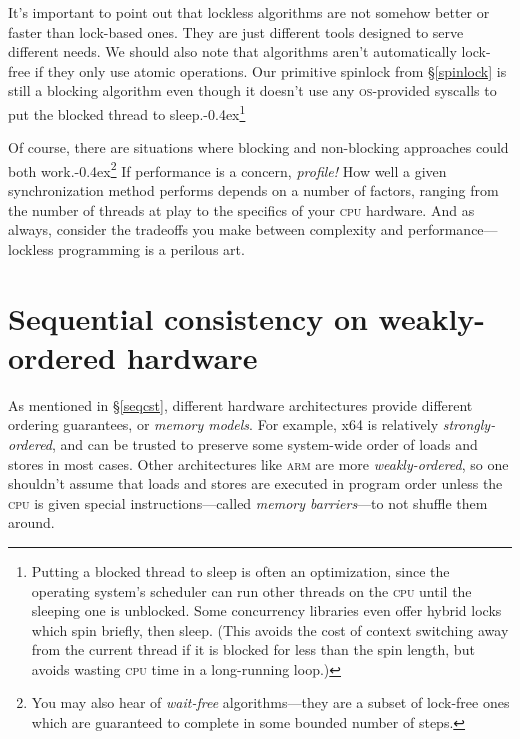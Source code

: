 \documentclass[fontsize=10pt, numbers=endperiod]{scrartcl}
\newcommand{\punckern}{\kern-0.4ex}
\newcommand{\introduce}[1]{\textit{#1}}
\newcommand{\secref}[1]{\hyperref[#1]{\textsc{\S}\ref*{#1}}}
\begin{document}
\begin{multicols*}{2}
It's important to point out that lockless algorithms are not somehow better
or faster than lock-based ones.
They are just different tools designed to serve different needs.
We should also note that algorithms aren't automatically lock-free if
they only use atomic operations.
Our primitive spinlock from \secref{spinlock} is still a blocking
algorithm even though it doesn't use any \textsc{os}-provided syscalls to
put the blocked thread to sleep.\punckern\footnote{Putting a blocked thread
to sleep is often an optimization,
since the operating system's scheduler can run other threads on the \textsc{cpu}
until the sleeping one is unblocked.
Some concurrency libraries even offer hybrid locks which spin briefly,
then sleep.
(This avoids the cost of context switching away from the current thread if it
is blocked for less than the spin length, but avoids wasting \textsc{cpu}
time in a long-running loop.)}

Of course, there are situations where blocking
and non-blocking approaches could both work.\punckern\footnote{You
may also hear of \introduce{wait-free} algorithms---they are a subset of
lock-free ones which are guaranteed to complete in some
bounded number of steps.}
If performance is a concern, \emph{profile!}
How well a given synchronization method performs depends on a number of factors,
ranging from the number of threads at
play to the specifics of your \textsc{cpu} hardware.
And as always, consider the tradeoffs you make between
complexity and performance---lockless programming is a perilous art.

\section{Sequential consistency on weakly-ordered hardware}

As mentioned in \secref{seqcst}, different hardware architectures
provide different ordering guarantees, or \introduce{memory models}.
For example, x64 is relatively \introduce{strongly-ordered},
and can be trusted to preserve some system-wide order of
loads and stores in most cases.
Other architectures like \textsc{arm} are more \introduce{weakly-ordered},
so one shouldn't assume that loads and stores are executed in
program order unless the \textsc{cpu} is given special instructions---called
\introduce{memory barriers}---to not shuffle them around.


\end{multicols*}
\end{document}
